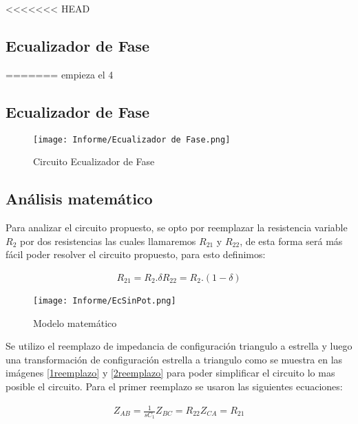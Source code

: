 <<<<<<< HEAD
\subsection{Ecualizador de Fase}
=======
empieza el 4

\subsection{Ecualizador de Fase}


\begin{figure}[H]
	\caption{Circuito Ecualizador de Fase}
	\centering
	\texttt{[image: Informe/Ecualizador de Fase.png]}
\end{figure}


\subsection{Análisis matemático}

Para analizar el circuito propuesto, se opto por reemplazar la resistencia variable $R_2$ por dos resistencias las cuales llamaremos $R_{21}$ y $R_{22}$, de esta forma será más fácil poder resolver el circuito propuesto, para esto definimos:

\begin{align}
	\begin{equation}
		R_{21} = R_2 . \delta
	\end{equation}
	\begin{equation}
		R_{22}= R_2 . (1 - \delta)
	\end{equation}
\end{align}


\begin{figure}[H]
	\centering
	\texttt{[image: Informe/EcSinPot.png]}
	\caption{Modelo matemático}
\end{figure}

Se utilizo el reemplazo de impedancia de configuración triangulo a estrella y luego una transformación de configuración estrella a triangulo como se muestra en las imágenes \ref{1reemplazo} y \ref{2reemplazo}  para poder simplificar el circuito lo mas posible el circuito.
Para el primer reemplazo se usaron las siguientes ecuaciones:

\begin{align}
	\begin{equation}
		Z_{AB}= \frac{1}{sC_1}
	\end{equation}
	\begin{equation}
		Z_{BC}= R_{22}
	\end{equation}
	
	\begin{equation}
		Z_{CA}= R_{21}
	\end{equation}
\end{align}

